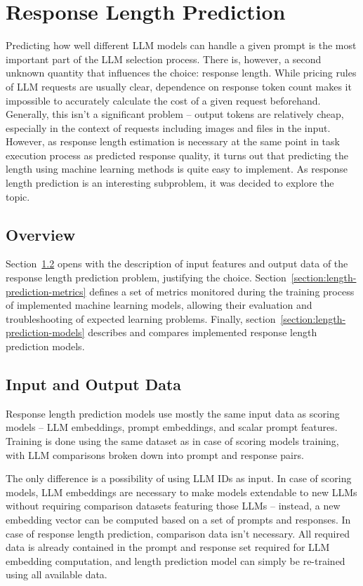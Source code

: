 \documentclass[a4paper,11pt,twoside]{report}
\theoremstyle{definition}
\begin{document}
\chapter{Response Length Prediction}
\label{section:length-prediction}

Predicting how well different LLM models can handle a given prompt is the most important part of the LLM selection process. There is, however, a second unknown quantity that influences the choice: response length. While pricing rules of LLM requests are usually clear, dependence on response token count makes it impossible to accurately calculate the cost of a given request beforehand. Generally, this isn't a significant problem -- output tokens are relatively cheap, especially in the context of requests including images and files in the input. However, as response length estimation is necessary at the same point in task execution process as predicted response quality, it turns out that predicting the length using machine learning methods is quite easy to implement. As response length prediction is an interesting subproblem, it was decided to explore the topic.

\section{Overview}

Section~\ref{section:length-prediction-features} opens with the description of input features and output data of the response length prediction problem, justifying the choice. Section~\ref{section:length-prediction-metrics} defines a set of metrics monitored during the training process of implemented machine learning models, allowing their evaluation and troubleshooting of expected learning problems. Finally, section~\ref{section:length-prediction-models} describes and compares implemented response length prediction models. 

\section{Input and Output Data}
\label{section:length-prediction-features}

Response length prediction models use mostly the same input data as scoring models -- LLM embeddings, prompt embeddings, and scalar prompt features. Training is done using the same dataset as in case of scoring models training, with LLM comparisons broken down into prompt and response pairs.

The only difference is a possibility of using LLM IDs as input. In case of scoring models, LLM embeddings are necessary to make models extendable to new LLMs without requiring comparison datasets featuring those LLMs -- instead, a new embedding vector can be computed based on a set of prompts and responses. In case of response length prediction, comparison data isn't necessary. All required data is already contained in the prompt and response set required for LLM embedding computation, and length prediction model can simply be re-trained using all available data. 
\end{document}
